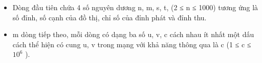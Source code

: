 \begin{itemize}
	\item     Dòng đầu tiên chứa 4 số nguyên dương n, m, s, t, (2 ≤ n ≤ 1000) tương ứng là số đỉnh, số cạnh của đồ thị, chỉ số của đỉnh phát và đỉnh thu.   
	\item     m dòng tiếp theo, mỗi dòng có dạng ba số u, v, c cách nhau ít nhất một dấu cách thể hiện có cung u, v trong mạng với khả năng thông qua là c (1 ≤ c ≤ $10^{6}$    ).   
\end{itemize}